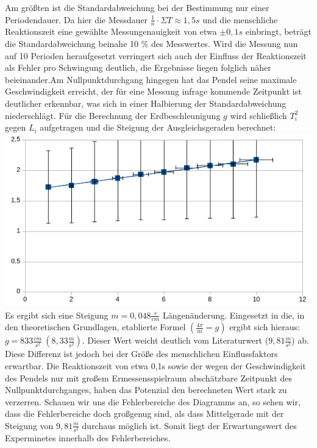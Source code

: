 \documentclass[11pt, a4paper]{article}
\begin{document}
Am größten ist die Standardabweichung bei der Bestimmung nur einer Periodendauer. Da hier die Messdauer $\frac{1}{n}\cdot \Sigma T \approx 1,5 s$ und die menschliche Reaktionszeit eine gewählte Messungenauigkeit von etwa $\pm 0,1s$ einbringt, beträgt die Standardabweichung beinahe 10 \% des Messwertes. Wird die Messung nun auf 10 Perioden heraufgesetzt verringert sich auch der Einfluss der Reaktionszeit als Fehler pro Schwingung deutlich, die Ergebnisse liegen folglich näher beieinander.Am Nullpunktdurchgang hingegen hat das Pendel seine maximale Geschwindigkeit erreicht, der für eine Messung infrage kommende Zeitpunkt ist deutlicher erkennbar, was sich in einer Halbierung der Standardabweichung niederschlägt. Für die Berechnung der Erdbeschleunigung $g$ wird schließlich $T_i^2$ gegen $L_i$ aufgetragen und die Steigung der Ausgleichsgeraden berechnet:\\
\includegraphics[scale=1]{Diagramm.png}\\
Es ergibt sich eine Steigung $m = 0,048\frac{s}{cm}$ Längenänderung. Eingesetzt in die, in den theoretischen Grundlagen, etablierte Formel $(\frac{4\pi}{m} = g)$
ergibt sich hieraus: $g = 833 \frac{cm}{s^2}\ (8,33\frac{m}{s^2})$. Dieser Wert weicht deutlich vom Literaturwert ($9,81\frac{m}{s^2}$) ab. Diese Differenz ist jedoch bei der Größe des menschlichen Einflussfaktors erwartbar. Die Reaktionszeit von etwa 0,1s sowie der wegen der Geschwindigkeit des Pendels nur mit großem Ermessensspielraum abschätzbare Zeitpunkt des Nullpunktdurchganges, haben das Potenzial den berechneten Wert stark zu verzerren. Schauen wir uns die Fehlerbereiche des Diagramms an, so sehen wir, dass die Fehlerbereiche doch großgenug sind, als dass Mittelgerade mit der Steigung von $9,81\frac{m}{s^2}$ durchaus möglich ist. Somit liegt der Erwartungswert des Experminetes innerhalb des Fehlerbereiches.
\end{document}
